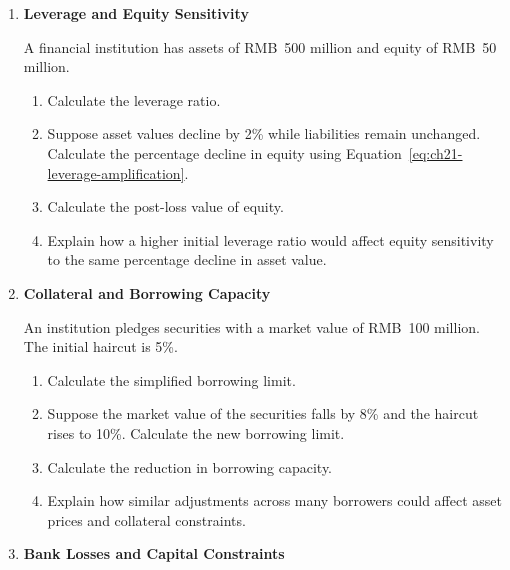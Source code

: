 
\begin{enumerate}

\item \textbf{Leverage and Equity Sensitivity}

A financial institution has assets of RMB~500 million and equity of RMB~50 million.

\begin{enumerate}

\item Calculate the leverage ratio.

\item Suppose asset values decline by 2\% while liabilities remain unchanged. Calculate the percentage decline in equity using Equation~\eqref{eq:ch21-leverage-amplification}.

\item Calculate the post-loss value of equity.

\item Explain how a higher initial leverage ratio would affect equity sensitivity to the same percentage decline in asset value.

\end{enumerate}


\item \textbf{Collateral and Borrowing Capacity}

An institution pledges securities with a market value of RMB~100 million. The initial haircut is 5\%.

\begin{enumerate}

\item Calculate the simplified borrowing limit.

\item Suppose the market value of the securities falls by 8\% and the haircut rises to 10\%. Calculate the new borrowing limit.

\item Calculate the reduction in borrowing capacity.

\item Explain how similar adjustments across many borrowers could affect asset prices and collateral constraints.

\end{enumerate}


\item \textbf{Bank Losses and Capital Constraints}


\end{enumerate}
